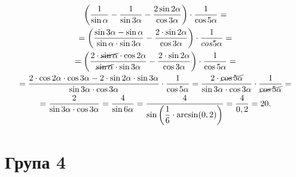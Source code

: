 \begin{multline*}
\left(\dfrac{1}{\sin\alpha}-\dfrac{1}{\sin3\alpha}-\dfrac{2\sin2\alpha}{\cos3\alpha}\right)\cdot\dfrac{1}{\cos5\alpha}=\\
=\left(\dfrac{\sin3\alpha-\sin\alpha}{\sin\alpha\cdot\sin3\alpha}-\dfrac{2\cdot\sin2\alpha}{\cos3\alpha}\right)\cdot\dfrac{1}{cos5\alpha}=\\
=\left(\dfrac{2\cdot\cancel{\sin\alpha}\cdot\cos2\alpha}{\cancel{\sin\alpha}\cdot\sin3\alpha}-\dfrac{2\cdot\sin2\alpha}{\cos3\alpha}\right)\cdot\dfrac{1}{\cos5\alpha}=\\
=\dfrac{2\cdot\cos2\alpha\cdot\cos3\alpha-2\cdot\sin2\alpha\cdot\sin3\alpha}{\sin3\alpha\cdot\cos3\alpha}\cdot\dfrac{1}{\cos5\alpha}=
\dfrac{2\cdot\cancel{\cos5\alpha}}{\sin3\alpha\cdot\cos3\alpha}\cdot\dfrac{1}{\cancel{\cos5\alpha}}=\\
=\dfrac{2}{\sin3\alpha\cdot\cos3\alpha}=
\dfrac{4}{\sin6\alpha}=
\dfrac{4}{\sin\left(\dfrac{1}{6}\cdot\arcsin(0,2)\right)}=
\dfrac{4}{0,2}=20.
\end{multline*}
\section*{Група 4}